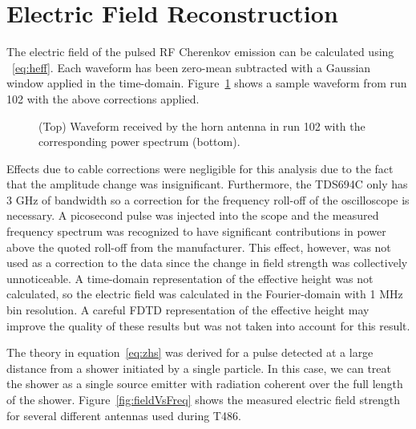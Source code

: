 \newpage
\section{Electric Field Reconstruction}
\label{ss:PulseRecon}
The electric field of the pulsed RF Cherenkov emission can be calculated using ~\ref{eq:heff}.  Each waveform has been zero-mean subtracted with a Gaussian window applied in the time-domain.  Figure~\ref{fig:hornWvfmPsd} shows a sample waveform from run 102 with the above corrections applied.

\begin{figure}[htbp]
\centering
\epsfxsize=5.2in
\caption{(Top) Waveform received by the horn antenna in run 102 with the corresponding power spectrum (bottom).}
\label{fig:hornWvfmPsd}
\end{figure}

\noindent Effects due to cable corrections were negligible for this analysis due to the fact that the amplitude change was insignificant.  Furthermore, the TDS694C only has 3 GHz of bandwidth so a correction for the frequency roll-off of the oscilloscope is necessary.  A picosecond pulse was injected into the scope and the measured frequency spectrum was recognized to have significant contributions in power above the quoted roll-off from the manufacturer.  This effect, however, was not used as a correction to the data since the change in field strength was collectively unnoticeable.  A time-domain representation of the effective height was not calculated, so the electric field was calculated in the Fourier-domain with 1 MHz bin resolution.  A careful FDTD representation of the effective height may improve the quality of these results but was not taken into account for this result.

\par The theory in equation~\ref{eq:zhs} was derived for a pulse detected at a large distance from a shower initiated by a single particle.  In this case, we can treat the shower as a single source emitter with radiation coherent over the full length of the shower.  Figure~\ref{fig:fieldVsFreq} shows the measured electric field strength for several different antennas used during T486.

